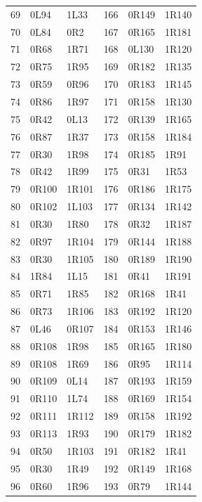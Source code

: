 \begin{longtable}{rll@{\hspace{1.2cm}}rll}
69&0L94&1L33&166&0R149&1R140\\
70&0L84&0R2&167&0R165&1R181\\
71&0R68&1R71&168&0L130&1R120\\
72&0R75&1R95&169&0R182&1R135\\
73&0R59&0R96&170&0R183&1R145\\
74&0R86&1R97&171&0R158&1R130\\
75&0R42&0L13&172&0R139&1R165\\
76&0R87&1R37&173&0R158&1R184\\
77&0R30&1R98&174&0R185&1R91\\
78&0R42&1R99&175&0R31&1R53\\
79&0R100&1R101&176&0R186&1R175\\
80&0R102&1L103&177&0R134&1R142\\
81&0R30&1R80&178&0R32&1R187\\
82&0R97&1R104&179&0R144&1R188\\
83&0R30&1R105&180&0R189&1R190\\
84&1R84&1L15&181&0R41&1R191\\
85&0R71&1R85&182&0R168&1R41\\
86&0R73&1R106&183&0R192&1R120\\
87&0L46&0R107&184&0R153&1R146\\
88&0R108&1R98&185&0R165&1R180\\
89&0R108&1R69&186&0R95&1R114\\
90&0R109&0L14&187&0R193&1R159\\
91&0R110&1L74&188&0R169&1R154\\
92&0R111&1R112&189&0R158&1R192\\
93&0R113&1R93&190&0R179&1R182\\
94&0R50&1R103&191&0R182&1R41\\
95&0R30&1R49&192&0R149&1R168\\
96&0R60&1R96&193&0R79&1R144\\
\end{longtable}
\endgroup
